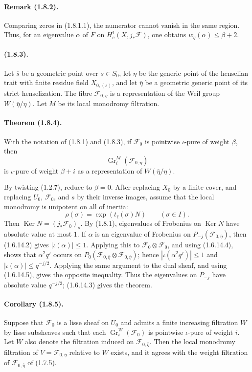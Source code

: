 \documentclass[11pt]{article}
\theoremstyle{remark}
\newcommand{\Gr}{\operatorname{Gr}}
\newcommand{\Ker}{\operatorname{Ker}}
\begin{document}
\paragraph{Remark (1.8.2).} Comparing zeros in (1.8.1.1), the numerator cannot vanish in the same region. Thus, for an eigenvalue $\alpha$ of $F$ on $H^1_c(X,j_*\mathcal F)$, one obtains $w_q(\alpha)\le \beta+2$.

\paragraph{(1.8.3).} Let $\overline s$ be a geometric point over $s\in S_0$, let $\eta$ be the generic point of the henselian trait with finite residue field $X_{0,(s)}$, and let $\overline\eta$ be a geometric generic point of its strict henselization. The fibre $\mathcal F_{0,\overline\eta}$ is a representation of the Weil group $W(\overline\eta/\eta)$. Let $M$ be its local monodromy filtration.

\paragraph{Theorem (1.8.4).} With the notation of (1.8.1) and (1.8.3), if $\mathcal F_0$ is pointwise $\iota$-pure of weight $\beta$, then
\[
        \Gr^M_i(\mathcal F_{0,\overline\eta})
\]
is $\iota$-pure of weight $\beta+i$ as a representation of $W(\overline\eta/\eta)$.

By twisting (1.2.7), reduce to $\beta=0$. After replacing $X_0$ by a finite cover, and replacing $U_0$, $\mathcal F_0$, and $s$ by their inverse images, assume that the local monodromy is unipotent on all of inertia:
\[
        \rho(\sigma)=\exp(t_\ell(\sigma)N)
        \qquad(\sigma\in I).
\]
Then $\Ker N=(j_*\mathcal F_0)_{\overline s}$. By (1.8.1), eigenvalues of Frobenius on $\Ker N$ have absolute value at most $1$. If $\alpha$ is an eigenvalue of Frobenius on $P_{-j}(\mathcal F_{0,\overline\eta})$, then (1.6.14.2) gives $|\iota(\alpha)|\le1$. Applying this to $\mathcal F_0\otimes\mathcal F_0$, and using (1.6.14.4), shows that $\alpha^2q^j$ occurs on $P_0(\mathcal F_{0,\overline\eta}\otimes\mathcal F_{0,\overline\eta})$; hence $|\iota(\alpha^2q^j)|\le1$ and $|\iota(\alpha)|\le q^{-j/2}$. Applying the same argument to the dual sheaf, and using (1.6.14.5), gives the opposite inequality. Thus the eigenvalues on $P_{-j}$ have absolute value $q^{-j/2}$; (1.6.14.3) gives the theorem.

\paragraph{Corollary (1.8.5).} Suppose that $\mathcal F_0$ is a lisse sheaf on $U_0$ and admits a finite increasing filtration $W$ by lisse subsheaves such that each $\Gr^W_i(\mathcal F_0)$ is pointwise $\iota$-pure of weight $i$. Let $W$ also denote the filtration induced on $\mathcal F_{0,\overline\eta}$. Then the local monodromy filtration of $V=\mathcal F_{0,\overline\eta}$ relative to $W$ exists, and it agrees with the weight filtration of $\mathcal F_{0,\overline\eta}$ of (1.7.5).
\end{document}

